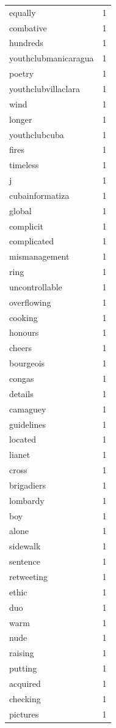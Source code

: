 \begin{tabular}{lr}
equally & 1 \\
combative & 1 \\
hundreds & 1 \\
youthclubmanicaragua & 1 \\
poetry & 1 \\
youthclubvillaclara & 1 \\
wind & 1 \\
longer & 1 \\
youthclubcuba & 1 \\
fires & 1 \\
timeless & 1 \\
j & 1 \\
cubainformatiza & 1 \\
global & 1 \\
complicit & 1 \\
complicated & 1 \\
mismanagement & 1 \\
ring & 1 \\
uncontrollable & 1 \\
overflowing & 1 \\
cooking & 1 \\
honours & 1 \\
cheers & 1 \\
bourgeois & 1 \\
congas & 1 \\
details & 1 \\
camaguey & 1 \\
guidelines & 1 \\
located & 1 \\
lianet & 1 \\
cross & 1 \\
brigadiers & 1 \\
lombardy & 1 \\
boy & 1 \\
alone & 1 \\
sidewalk & 1 \\
sentence & 1 \\
retweeting & 1 \\
ethic & 1 \\
duo & 1 \\
warm & 1 \\
nude & 1 \\
raising & 1 \\
putting & 1 \\
acquired & 1 \\
checking & 1 \\
pictures & 1 \\

\end{tabular}
